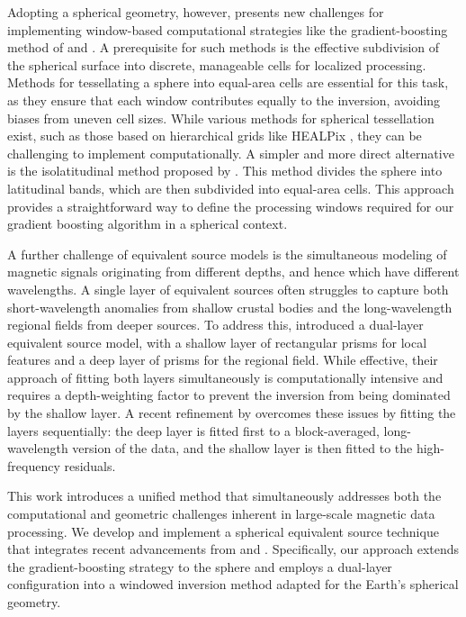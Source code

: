 \documentclass[a4paper,oneside,10pt]{book}
\begin{document}
Adopting a spherical geometry, however, presents new challenges for
implementing window-based computational strategies like the gradient-boosting
method of \citet{Soler2021} and \citet{Uppal2025}.
A prerequisite for such methods is the effective subdivision of the spherical
surface into discrete, manageable cells for localized processing.
Methods for tessellating a sphere into equal-area cells are essential for this
task, as they ensure that each window contributes equally to the inversion,
avoiding biases from uneven cell sizes.
While various methods for spherical tessellation exist, such as those based on
hierarchical grids like HEALPix \citep{Gorski1998}, they can be challenging to
implement computationally.
A simpler and more direct alternative is the isolatitudinal method proposed by
\citet{Malkin2016}.
This method divides the sphere into latitudinal bands, which are then
subdivided into equal-area cells.
This approach provides a straightforward way to define the processing windows
required for our gradient boosting algorithm in a spherical context.

A further challenge of equivalent source models is the simultaneous modeling of
magnetic signals originating from different depths, and hence which have
different wavelengths.
A single layer of equivalent sources often struggles to capture both
short-wavelength anomalies from shallow crustal bodies and the long-wavelength
regional fields from deeper sources.
To address this, \citet{Li2020} introduced a dual-layer equivalent source
model, with a shallow layer of rectangular prisms for local features and a deep
layer of prisms for the regional field.
While effective, their approach of fitting both layers simultaneously is
computationally intensive and requires a depth-weighting factor to prevent the
inversion from being dominated by the shallow layer.
A recent refinement by \citet{Uppal2025} overcomes these issues by fitting the
layers sequentially: the deep layer is fitted first to a block-averaged,
long-wavelength version of the data, and the shallow layer is then fitted to
the high-frequency residuals.

This work introduces a unified method that simultaneously addresses both the
computational and geometric challenges inherent in large-scale magnetic data
processing.
We develop and implement a spherical equivalent source technique that
integrates recent advancements from \citet{Soler2021} and \citet{Uppal2025}.
Specifically, our approach extends the gradient-boosting strategy to the sphere
\citep{Soler2021} and employs a dual-layer configuration \citep{Uppal2025} into
a windowed inversion method adapted for the Earth's spherical geometry.
\end{document}
